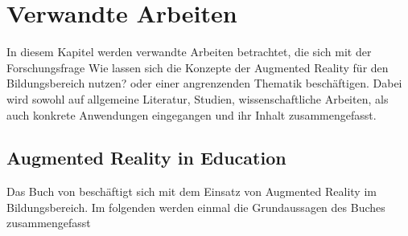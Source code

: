 \chapter{Verwandte Arbeiten}\label{chapter:arbeiten}
In diesem Kapitel werden verwandte Arbeiten betrachtet, die sich mit der Forschungsfrage \glqq Wie lassen sich die Konzepte der Augmented Reality für den Bildungsbereich nutzen?\grqq{} oder einer angrenzenden Thematik beschäftigen. Dabei wird sowohl auf allgemeine Literatur, Studien, wissenschaftliche Arbeiten, als auch konkrete Anwendungen eingegangen und ihr Inhalt zusammengefasst.

\section{Augmented Reality in Education}
Das Buch \citep{geroimenko:ar-in-education} von \citeauthor{geroimenko:ar-in-education} beschäftigt sich mit dem Einsatz von Augmented Reality im Bildungsbereich. Im folgenden werden einmal die Grundaussagen des Buches zusammengefasst

